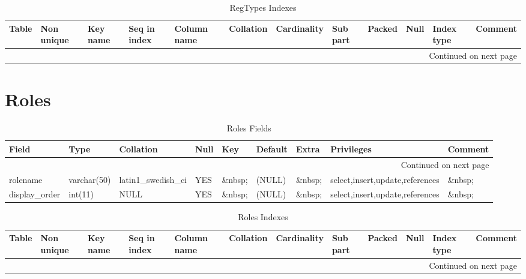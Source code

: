 \documentclass[tablesignature,landscape]{scrartcl}
\begin{document}
\begin{longtable}{|l|l|l|l|l|l|l|l|l|l|l|l|}
\caption{RegTypes Indexes} \label{tbl:regtypesindexes}\\
\hline
 Table     &  Non unique  &  Key name  &  Seq in index  &  Column name  &  Collation  &  Cardinality  &  Sub part  &  Packed  &  Null     &  Index type  &  Comment \\
\hline
\endhead
\hline\multicolumn{12}{r}{Continued on next page}\
\endfoot
\endlastfoot
\hline
 RegTypes  &           0  &  PRIMARY   &             1  &  regtype      &  A          &            9  &  (NULL)    &  (NULL)  &  \&nbsp;  &  BTREE       &  \&nbsp;  \\
\hline
\end{longtable}
\section{Roles}
\label{sec-20}


\begin{longtable}{|l|l|l|l|l|l|l|l|l|}
\caption{Roles Fields} \label{tbl:rolesfields}\\
\hline
 Field             &  Type         &  Collation                &  Null     &  Key      &  Default  &  Extra              &  Privileges                       &  Comment \\
\hline
\endhead
\hline\multicolumn{9}{r}{Continued on next page}\
\endfoot
\endlastfoot
\hline
 roleid            &  int(11)      &  NULL                     &  \&nbsp;  &  PRI      &  (NULL)   &  auto\_{}increment  &  select,insert,update,references  &  \&nbsp;  \\
 rolename          &  varchar(50)  &  latin1\_{}swedish\_{}ci  &  YES      &  \&nbsp;  &  (NULL)   &  \&nbsp;            &  select,insert,update,references  &  \&nbsp;  \\
 display\_{}order  &  int(11)      &  NULL                     &  YES      &  \&nbsp;  &  (NULL)   &  \&nbsp;            &  select,insert,update,references  &  \&nbsp;  \\
\hline
\end{longtable}


\begin{longtable}{|l|l|l|l|l|l|l|l|l|l|l|l|}
\caption{Roles Indexes} \label{tbl:rolesindexes}\\
\hline
 Table  &  Non unique  &  Key name  &  Seq in index  &  Column name  &  Collation  &  Cardinality  &  Sub part  &  Packed  &  Null     &  Index type  &  Comment \\
\hline
\endhead
\hline\multicolumn{12}{r}{Continued on next page}\
\endfoot
\endlastfoot
\hline
 Roles  &           0  &  PRIMARY   &             1  &  roleid       &  A          &           12  &  (NULL)    &  (NULL)  &  \&nbsp;  &  BTREE       &  \&nbsp;  \\
\hline
\end{longtable}
\end{document}
